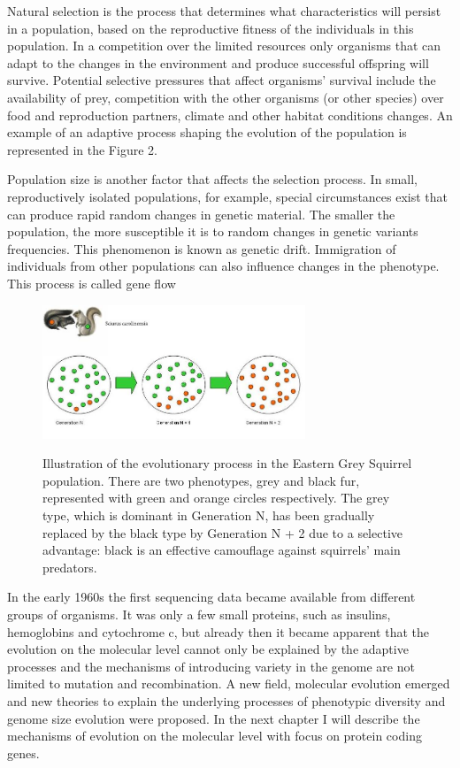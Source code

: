 \documentclass[11pt, a4paper,oneside]{report}
\begin{document}
Natural selection is the process that determines what characteristics will persist in a population, based on the reproductive fitness of the individuals in this population. In a competition over the limited resources only organisms that can adapt to the changes in the environment and produce successful offspring will survive. Potential selective pressures that affect organisms' survival include the availability of prey, competition with the other organisms (or other species) over food and reproduction partners, climate and other habitat conditions changes. An example of an adaptive process shaping the evolution of the population is represented in the Figure 2.

Population size is another factor that affects the selection process.  In small, reproductively isolated populations, for example, special circumstances exist that can produce rapid random changes in genetic material. The smaller the population, the more susceptible it is to random changes in genetic variants frequencies.  This phenomenon is known as genetic drift. Immigration of individuals from other populations can also influence changes in the phenotype. This process is called gene flow\cite{Grant1980}

\begin{figure}[ht]
\begin{center}
\label{img:populations}
\includegraphics[width=0.7\textwidth]{figures/squirrel.jpg}
\end{center}
\caption{ Illustration of the evolutionary process in the Eastern Grey Squirrel population. There are two phenotypes, grey and black fur, represented with green and orange circles respectively. The grey type, which is dominant in Generation N, has been gradually replaced by the black type by Generation N + 2 due to a selective advantage: black is an effective camouflage against squirrels' main predators.} 
\end{figure}

In the early 1960s the first sequencing data became available from different groups of organisms. It was only a few small proteins, such as insulins\cite{Sanger1945}, hemoglobins\cite{INGRAM1956} and cytochrome c, but already then it became apparent that the evolution on the molecular level cannot only be explained by the adaptive processes and the mechanisms of introducing variety in the genome are not limited to mutation and recombination. A new field, molecular evolution emerged and new theories to explain the underlying processes of phenotypic diversity and genome size evolution were proposed.  In the next chapter I will describe the mechanisms of evolution on the molecular level with focus on protein coding genes. 
\end{document}
